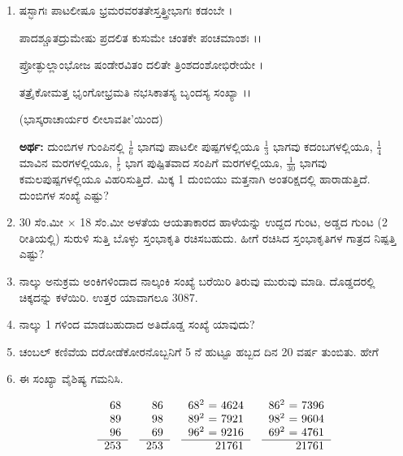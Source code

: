 \begin{enumerate}
\item ಷಸ್ಭಾಗಃ ಪಾಟಲೀಷೂ ಭ್ರಮರವರತತೇಸ್ತತ್ತ್ರೀಭಾಗಃ ಕಡಂಬೇ ।

ಪಾದಶ್ಚೂತದ್ರುಮೇಷು ಪ್ರದಲಿತ ಕುಸುಮೇ ಚಂತಕೇ ಪಂಚಮಾಂಶಃ ।।

ಪ್ರೋತ್ಫುಲ್ಲಾಂಭೋಜ ಷಂಡೇರವಿತಂ ದಲಿತೇ ತ್ರಿಂಶದಂಶೋಭಿರೇಯೇ । 

ತತ್ರೈಕೋಮತ್ತ ಭೃಂಗೋಭ್ರಮತಿ ನಭಸಿಕಾತಸ್ಯ ಬೃಂದಸ್ಯ ಸಂಖ್ಯಾ ।।

\smallskip
\hfill (ಭಾಸ್ಕರಾಚಾರ್ಯರ ಲೀಲಾವತೀ'ಯಿಂದ)

\smallskip
{\bf ಅರ್ಥ:} ದುಂಬಿಗಳ ಗುಂಪಿನಲ್ಲಿ $\frac{1}{6}$ ಭಾಗವು ಪಾಟಲೀ ಪುಷ್ಪಗಳಲ್ಲಿಯೂ $\frac{1}{3}$ ಭಾಗವು ಕದಂಬಗಳಲ್ಲಿಯೂ, $\frac{1}{4}$ ಮಾವಿನ ಮರಗಳಲ್ಲಿಯೂ, $\frac{1}{5}$ ಭಾಗ ಪುಷ್ಪಿತವಾದ ಸಂಪಿಗೆ  ಮರಗಳಲ್ಲಿಯೂ, $\frac{1}{30}$ ಭಾಗವು ಕಮಲಪುಷ್ಪಗಳಲ್ಲಿಯೂ ವಿಹರಿಸುತ್ತಿದೆ. ಮಿಕ್ಕ 1 ದುಂಬಿಯು ಮತ್ತನಾಗಿ ಅಂತರಿಕ್ಷದಲ್ಲಿ ಹಾರಾಡುತ್ತಿದೆ. ದುಂಬಿಗಳ ಸಂಖ್ಯೆ ಎಷ್ಟು? 

\item 30 ಸೆಂ.ಮೀ $\times $ 18 ಸೆಂ.ಮೀ ಅಳತೆಯ ಆಯತಾಕಾರದ ಹಾಳೆಯನ್ನು ಉದ್ದದ ಗುಂಟ, ಅಡ್ಡದ ಗುಂಟ (2 ರೀತಿಯಲ್ಲಿ) ಸುರುಳಿ ಸುತ್ತಿ ಬೊಳ್ಳು ಸ್ತಂಭಾಕೃತಿ ರಚಿಸಬಹುದು. ಹೀಗೆ ರಚಿಸಿದ ಸ್ತಂಭಾಕೃತಿಗಳ ಗಾತ್ರದ ನಿಷ್ಪತ್ತಿ ಎಷ್ಟು? 

\item ನಾಲ್ಕು ಅನುಕ್ರಮ ಅಂಕಿಗಳಿಂದಾದ ನಾಲ್ಕಂಕಿ ಸಂಖ್ಯೆ ಬರೆಯಿರಿ ತಿರುವು ಮುರುವು ಮಾಡಿ. ದೊಡ್ಡದರಲ್ಲಿ ಚಿಕ್ಕದನ್ನು ಕಳೆಯಿರಿ. ಉತ್ತರ ಯಾವಾಗಲೂ 3087. 

\item ನಾಲ್ಕು 1 ಗಳಿಂದ ಮಾಡಬಹುದಾದ ಅತಿದೊಡ್ಡ ಸಂಖ್ಯೆ ಯಾವುದು? 

\item ಚಂಬಲ್ ಕಣಿವೆಯ ದರೋಡೆಕೋರನೊಬ್ಬನಿಗೆ 5 ನೆ ಹುಟ್ಟೂ ಹಬ್ಬದ ದಿನ 20 ವರ್ಷ ತುಂಬಿತು. ಹೇಗೆ 

\item ಈ ಸಂಖ್ಯಾ ವೈಶಿಷ್ಯ ಗಮನಿಸಿ. 

\begin{equation*}
\begin{tabular}[t]{r}
68 \\
89\\
96\\\cline{1-1} 
253
\end{tabular}
\quad
\begin{tabular}[t]{r}
86\\ 
98\\
69\\\cline{1-1} 
253
\end{tabular}
\quad
\begin{tabular}[t]{r}
68$^{2}$ = 4624 \\
89$^{2}$ = 7921\\
96$^{2}$ = 9216\\\cline{1-1} 
\qquad 21761
\end{tabular}
\quad
\begin{tabular}[t]{r}
86$^{2}$ = 7396\\ 
98$^{2}$ = 9604\\
69$^{2}$ = 4761\\\cline{1-1} 
\qquad 21761
\end{tabular}
\end{equation*}
\end{enumerate}


